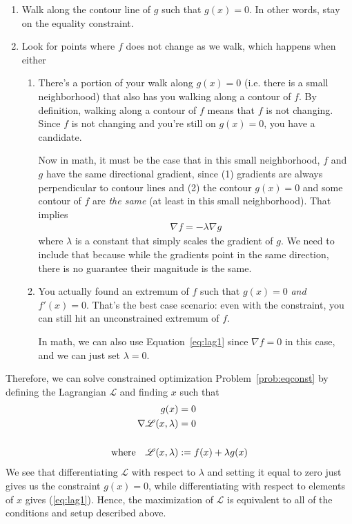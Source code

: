 \documentclass[a4paper,12pt]{scrartcl}
\theoremstyle{definition}
\theoremstyle{remark}
\begin{document}
\begin{enumerate}
  \item Walk along the contour line of $g$ such that $g(x)=0$. In other
    words, stay on the equality constraint.
  \item Look for points where $f$ does not change as we walk, which
    happens when either
    \begin{enumerate}
      \item There's a portion of your walk along $g(x)=0$ (i.e. there is
        a small neighborhood) that also has you walking along a contour
        of $f$. By definition, walking along a contour of $f$ means that
        $f$ is not changing. Since $f$ is not changing and you're still
        on $g(x)=0$, you have a candidate.

        Now in math, it must be the case that in this small
        neighborhood, $f$ and $g$ have the same directional gradient,
        since (1) gradients are always perpendicular to contour lines
        and (2) the contour $g(x)=0$ and some contour of $f$ are
        \emph{the same} (at least in this small neighborhood). That
        implies
        \begin{align}
          \nabla f = -\lambda \nabla g
          \label{eq:lag1}
        \end{align}
        where $\lambda$ is a constant that simply scales the gradient of
        $g$. We need to include that because while the gradients point
        in the same direction, there is no guarantee their magnitude is
        the same.

      \item You actually found an extremum of $f$ such that $g(x)=0$
        \emph{and} $f'(x)=0$. That's the best case scenario: even with
        the constraint, you can still hit an unconstrained extremum of
        $f$.

        In math, we can also use Equation~\ref{eq:lag1} since
        $\nabla f=0$ in this case, and we can just set $\lambda=0$.
    \end{enumerate}
  \end{enumerate}
Therefore, we can solve constrained optimization
Problem~\ref{prob:eqconst} by defining the Lagrangian $\mathscr{L}$
and finding $x$ such that
\begin{align}
  g(x) &= 0\label{lagrangeSingle}\\
  \nabla \mathscr{L}(x,\lambda) &= 0 \notag\\\notag\\
  \text{where} \quad
  \mathscr{L}(x,\lambda) &:= f(x) + \lambda g(x) \notag
\end{align}
We see that differentiating $\mathscr{L}$ with respect to $\lambda$ and
setting it equal to zero just gives us the constraint $g(x)=0$, while
differentiating with respect to elements of $x$ gives (\ref{eq:lag1}).
Hence, the maximization of $\mathscr{L}$ is equivalent to all of the
conditions and setup described above.
\end{document}
